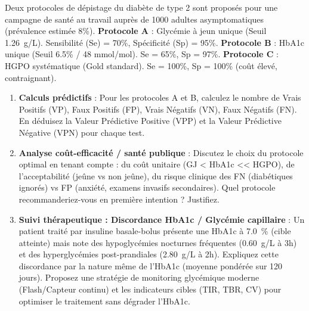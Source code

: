 \documentclass[11pt]{article}
\begin{document}
\begin{exercice}
Deux protocoles de dépistage du diabète de type 2 sont proposés pour une campagne de santé au travail auprès de 1000 adultes asymptomatiques (prévalence estimée 8\%).
\textbf{Protocole A} : Glycémie à jeun unique (Seuil \SI{1.26}{g/L}). Sensibilité (Se) = 70\%, Spécificité (Sp) = 95\%.
\textbf{Protocole B} : HbA1c unique (Seuil 6.5\% / 48 mmol/mol). Se = 65\%, Sp = 97\%.
\textbf{Protocole C} : HGPO systématique (Gold standard). Se = 100\%, Sp = 100\% (coût élevé, contraignant).

\begin{enumerate}
    \item \textbf{Calculs prédictifs} : Pour les protocoles A et B, calculez le nombre de Vrais Positifs (VP), Faux Positifs (FP), Vrais Négatifs (VN), Faux Négatifs (FN). En déduisez la Valeur Prédictive Positive (VPP) et la Valeur Prédictive Négative (VPN) pour chaque test.
    \item \textbf{Analyse coût-efficacité / santé publique} : Discutez le choix du protocole optimal en tenant compte : du coût unitaire (GJ < HbA1c << HGPO), de l'acceptabilité (jeûne vs non jeûne), du risque clinique des FN (diabétiques ignorés) vs FP (anxiété, examens invasifs secondaires). Quel protocole recommanderiez-vous en première intention ? Justifiez.
    \item \textbf{Suivi thérapeutique : Discordance HbA1c / Glycémie capillaire} : Un patient traité par insuline basale-bolus présente une HbA1c à \SI{7.0}{\%} (cible atteinte) mais note des hypoglycémies nocturnes fréquentes (\SI{0.60}{g/L} à 3h) et des hyperglycémies post-prandiales (\SI{2.80}{g/L} à 2h). Expliquez cette discordance par la nature même de l'HbA1c (moyenne pondérée sur 120 jours). Proposez une stratégie de monitoring glycémique moderne (Flash/Capteur continu) et les indicateurs cibles (TIR, TBR, CV) pour optimiser le traitement sans dégrader l'HbA1c.
\end{enumerate}
\end{exercice}
\end{document}
